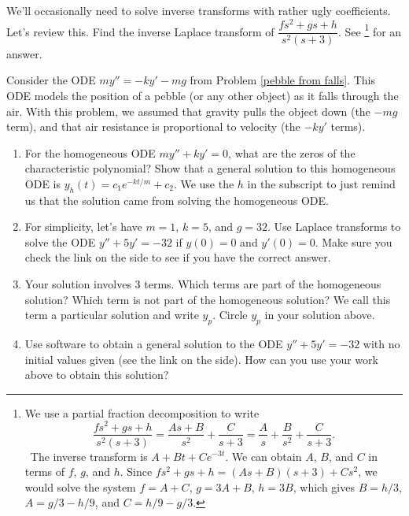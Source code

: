 \begin{review*}
We'll occasionally need to solve inverse transforms with rather ugly coefficients.  Let's review this.
Find the inverse Laplace transform of 
$\dfrac{fs^2+gs+h}{s^2(s+3)}$. See \footnote{
We use a partial fraction decomposition to write 
$$\dfrac{fs^2+gs+h}{s^2(s+3)} = \frac{As+B}{s^2}+\frac{C}{s+3} = \frac{A}{s}+\frac{B}{s^2}+\frac{C}{s+3}. $$\
The inverse transform is $A+Bt+Ce^{-3t}$. We can obtain $A$, $B$, and $C$ in terms of $f$, $g$, and $h$. Since $fs^2+gs+h = (As+B)(s+3) + Cs^2$, we would solve the system $f=A+C$, $g=3A+B$, $h=3B$, which gives $B=h/3$, $A=g/3-h/9$, and $C=h/9-g/3$. 
} for an answer.
\end{review*}

\begin{problem}%
 Consider the ODE $my''=-ky'-mg$ from Problem \ref{pebble from falls}.  This ODE models the position of a pebble (or any other object) as it falls through the air. With this problem, we assumed that gravity pulls the object down (the $-mg$ term), and that air resistance is proportional to velocity (the $-ky'$ terms). 
\begin{enumerate}
 \item For the homogeneous ODE $my''+ky'=0$, what are the zeros of the characteristic polynomial? Show that a general solution to this homogeneous ODE is $y_h(t) = c_1e^{-kt/m} + c_2$. We use the $h$ in the subscript to just remind us that the solution came from solving the homogeneous ODE. 
 \item
{}%
For simplicity, let's have $m=1$, $k=5$, and $g=32$. Use Laplace transforms to solve the ODE $y''+5y'=-32$ if $y(0)=0$ and $y'(0)=0$. Make sure you check the link on the side to see if you have the correct answer. 
 \item Your solution involves 3 terms. Which terms are part of the homogeneous solution?  Which term is not part of the homogeneous solution? We call this term a particular solution and write $y_p$. Circle $y_p$ in your solution above. 
 \item
{}%
 Use software to obtain a general solution to the ODE $y''+5y'=-32$ with no initial values given (see the link on the side). How can you use your work above to obtain this solution?
\end{enumerate}
\end{problem}

